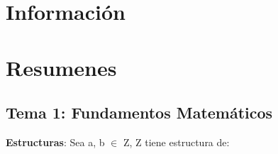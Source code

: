 \documentclass[12pt, twoside, openright]{report} %
\begin{document}





\part{Información}






\part{Resumenes}
\chapter{Tema 1: Fundamentos Matemáticos}


  
  \textbf{Estructuras}: Sea a, b $\in$ Z, Z tiene estructura de:
  
\end{document}
